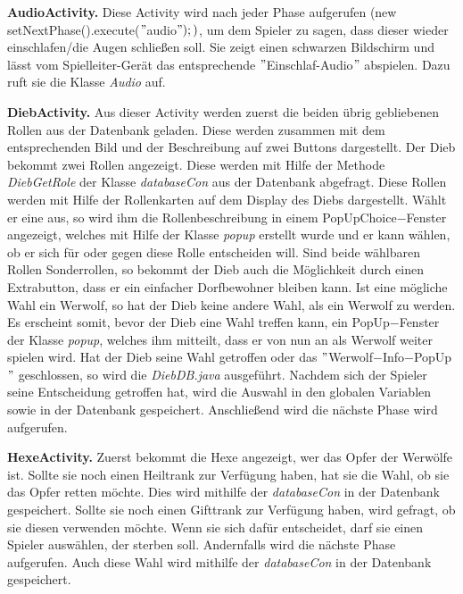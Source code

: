 \documentclass[12pt]{article}
\begin{document}
\vspace{0,3 cm}
      
\textbf{AudioActivity.}
Diese Activity wird nach jeder Phase aufgerufen (new setNextPhase().execute($"$audio$");)$, um dem Spieler zu sagen, dass dieser wieder einschlafen/die Augen schließen soll. Sie zeigt einen schwarzen Bildschirm und lässt vom Spielleiter-Gerät das entsprechende $"$Einschlaf-Audio$"$ abspielen. Dazu ruft sie die Klasse \textit{Audio} auf.

\vspace{0,3 cm}

\textbf{DiebActivity.}
Aus dieser Activity werden zuerst die beiden übrig gebliebenen Rollen aus der Datenbank geladen. Diese werden zusammen mit dem entsprechenden Bild und der Beschreibung auf zwei Buttons dargestellt.
Der Dieb bekommt zwei Rollen angezeigt. Diese werden mit Hilfe der Methode \textit{DiebGetRole} der Klasse \textit{databaseCon} aus der Datenbank abgefragt. Diese Rollen werden mit Hilfe der Rollenkarten auf dem Display des Diebs dargestellt. Wählt er eine aus, so wird ihm die Rollenbeschreibung in einem PopUpChoice$-$Fenster angezeigt, welches mit Hilfe der Klasse \textit{popup} erstellt wurde und er kann wählen, ob er sich für oder gegen diese Rolle entscheiden will. 
Sind beide wählbaren Rollen Sonderrollen, so bekommt der Dieb auch die Möglichkeit durch einen Extrabutton, dass er ein einfacher Dorfbewohner bleiben kann. Ist eine mögliche Wahl ein Werwolf, so hat der Dieb keine andere Wahl, als ein Werwolf zu werden. Es erscheint somit, bevor der Dieb eine Wahl treffen kann, ein PopUp$-$Fenster der Klasse \textit{popup}, welches ihm mitteilt, dass er von nun an als Werwolf weiter spielen wird. Hat der Dieb seine Wahl getroffen oder das $"$Werwolf$-$Info$-$PopUp$"$ geschlossen, so wird die \textit{DiebDB.java} ausgeführt. 
Nachdem sich der Spieler seine Entscheidung getroffen hat, wird die Auswahl in den globalen Variablen sowie in der Datenbank gespeichert. Anschließend wird die nächste Phase wird aufgerufen.

\vspace{0,3 cm}
      
\textbf{HexeActivity.}
Zuerst bekommt die Hexe angezeigt, wer das Opfer der Werwölfe ist.
Sollte sie noch einen Heiltrank zur Verfügung haben, hat sie die Wahl, ob sie das Opfer retten möchte. 
Dies wird mithilfe der \textit{databaseCon} in der Datenbank gespeichert.
Sollte sie noch einen Gifttrank zur Verfügung haben, wird gefragt, ob sie diesen verwenden möchte.
Wenn sie sich dafür entscheidet, darf sie einen Spieler auswählen, der sterben soll.
Andernfalls wird die nächste Phase aufgerufen.
Auch diese Wahl wird mithilfe der \textit{databaseCon} in der Datenbank gespeichert.
      
\end{document}
